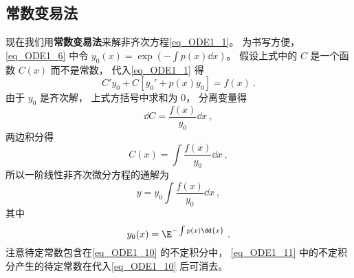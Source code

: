 \subsection{常数变易法}

现在我们用\textbf{常数变易法}来解非齐次方程\autoref{eq_ODE1_1}。 为书写方便， \autoref{eq_ODE1_6} 中令 $y_0(x) = \exp(-\int p(x) \dd{x})$。 假设上式中的 $C$ 是一个函数 $C(x)$ 而不是常数， 代入\autoref{eq_ODE1_1} 得
\begin{equation}
C'y_0 + C[y_0' + p(x)y_0] = f(x)~.
\end{equation}
由于 $y_0$ 是齐次解， 上式方括号中求和为 0， 分离变量得
\begin{equation}
\dd{C}= \frac{f(x)}{y_0} \dd{x}~,
\end{equation}
两边积分得
\begin{equation}
C(x) = \int \frac{f(x)}{y_0} \dd{x}~,
\end{equation}
所以一阶线性非齐次微分方程的通解为
\begin{equation}\label{eq_ODE1_10}
y = y_0  \int \frac{f(x)}{y_0} \dd{x}~,
\end{equation}
其中
\begin{equation}\label{eq_ODE1_11}
y_0(x) = \E^{-\int p(x) \dd{x}}~.
\end{equation}
注意待定常数包含在\autoref{eq_ODE1_10} 的不定积分中， \autoref{eq_ODE1_11} 中的不定积分产生的待定常数在代入\autoref{eq_ODE1_10} 后可消去。

